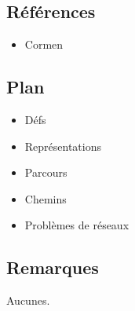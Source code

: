 \documentclass[../../agregation.tex]{subfiles}
\begin{document}

\dvts

\subsection{Références}

\begin{itemize}
	\item Cormen
	
\end{itemize}

\subsection{Plan}

\begin{itemize}
	\item Défs
	\item Représentations
	\item Parcours
	\item Chemins
	\item Problèmes de réseaux
\end{itemize}

\subsection{Remarques}

Aucunes.
\end{document}
